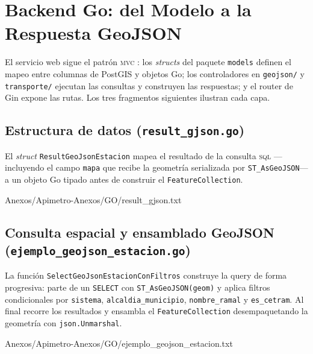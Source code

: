 
\section{Backend Go: del Modelo a la Respuesta GeoJSON}
\label{anx:apimetro-backend}

El servicio web sigue el patrón \textsc{mvc} \citep{gamma1994}: los \textit{structs} del paquete
\texttt{models} definen el mapeo entre columnas de PostGIS y objetos Go; los
controladores en \texttt{geojson/} y \texttt{transporte/} ejecutan las consultas
y construyen las respuestas; y el router de Gin expone las rutas. Los tres
fragmentos siguientes ilustran cada capa.

\subsection*{Estructura de datos (\texttt{result\_gjson.go})}

El \textit{struct} \texttt{ResultGeoJsonEstacion} mapea el resultado de la
consulta \textsc{sql} —incluyendo el campo \texttt{mapa} que recibe la geometría
serializada por \texttt{ST\_AsGeoJSON}— a un objeto Go tipado antes de construir
el \texttt{FeatureCollection}.

 {Anexos/Apimetro-Anexos/GO/result_gjson.txt}

\subsection*{Consulta espacial y ensamblado GeoJSON
(\texttt{ejemplo\_geojson\_estacion.go})}

La función \texttt{SelectGeoJsonEstacionConFiltros} construye la query de forma
progresiva: parte de un \texttt{SELECT} con \texttt{ST\_AsGeoJSON(geom)} y
aplica filtros condicionales por \texttt{sistema}, \texttt{alcaldia\_municipio},
\texttt{nombre\_ramal} y \texttt{es\_cetram}. Al final recorre los resultados y
ensambla el \texttt{FeatureCollection} desempaquetando la geometría con
\texttt{json.Unmarshal}.

 {Anexos/Apimetro-Anexos/GO/ejemplo_geojson_estacion.txt}

